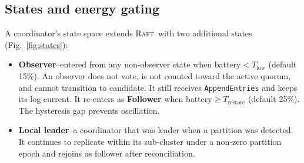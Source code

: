 \documentclass[conference]{IEEEtran}
\newcommand{\raftproto}{\textsc{Raft}\xspace}
\begin{document}
\subsection{States and energy gating}
A coordinator's state space extends \raftproto\ with two additional
states (Fig.~\ref{fig:states}):
\begin{itemize}
\item \textbf{Observer}--entered from any non-observer state when
  $\text{battery} < T_{\text{low}}$ (default 15\%). An observer does
  not vote, is not counted toward the active quorum, and cannot
  transition to candidate. It still receives \texttt{AppendEntries} and
  keeps its log current. It re-enters as \textbf{Follower} when
  $\text{battery} \ge T_{\text{restore}}$ (default 25\%). The hysteresis
  gap prevents oscillation.
\item \textbf{Local leader}--a coordinator that was leader when a
  partition was detected. It continues to replicate within its
  sub-cluster under a non-zero partition epoch and rejoins as follower
  after reconciliation.
\end{itemize}
\end{document}
